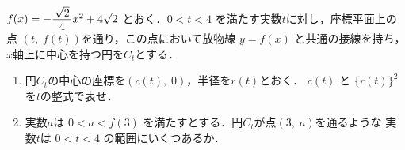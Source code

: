 ﻿\documentclass[../../../uem_mat_tok_q.tex]{subfiles}
\begin{document}
    $f(x)=-\myfraca{\sqrt{2}}{4}x^2+4\sqrt{2}$ とおく．$0<t<4$ を満たす実数$t$に対し，座標平面上の点%
    $(t,\;f(t))$を通り，この点において放物線 $y=f(x)$ と共通の接線を持ち，%
    $x$軸上に中心を持つ円を$C_t$とする．

    \begin{enumerate}
        \item 円$C_t$の中心の座標を$(c(t),\;0)$，半径を$r(t)$とおく．%
            $c(t)$ と $\{r(t)\}^2$ を$t$の整式で表せ．
        \item 実数$a$は $0<a<f(3)$ を満たすとする．円$C_t$が点$(3,\;a)$を通るような%
            実数$t$は $0<t<4$ の範囲にいくつあるか．
    \end{enumerate}
\end{document}
